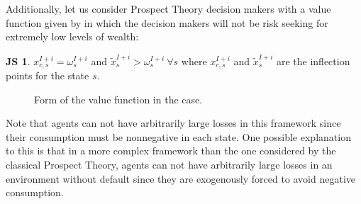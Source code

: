 \documentclass[pdftex]{article}
\numberwithin{equation}{section}
\theoremstyle{th}
\newtheorem{proof lemma}{{Proof Lemma}.}
\theoremstyle{definition}
\newtheorem{A}{A\hspace{-0.15cm}}
\newtheorem*{JS}{JS\hspace{-0.15cm}}
\begin{document}
{Additionally, let us consider Prospect Theory decision makers with a value function given by \cite{JS} in which the decision makers will not be risk seeking for extremely low levels of wealth:
\begin{JS}
$x^{I+i}_{c,s}=\omega^{I+i}_s$ and $\tilde{x}^{I+i}_s>\omega^{I+i}_s\ \forall{s}$ where $x^{I+i}_{c,s}$ and $\tilde{x}^{I+i}_s$ are the inflection points for the state $s$.
\end{JS}

\begin{figure}[h]
\begin{center}
\end{center}
\caption{Form of the value function in the \cite{JS} case.}
\end{figure}


Note that agents can not have arbitrarily large losses  in this framework since their consumption must be nonnegative in each state. One possible explanation to this is that in a more complex framework than the one considered by the classical Prospect Theory, agents can not have arbitrarily large losses in an environment without default since they are exogenously forced to avoid negative consumption.


%


}
\end{document}
